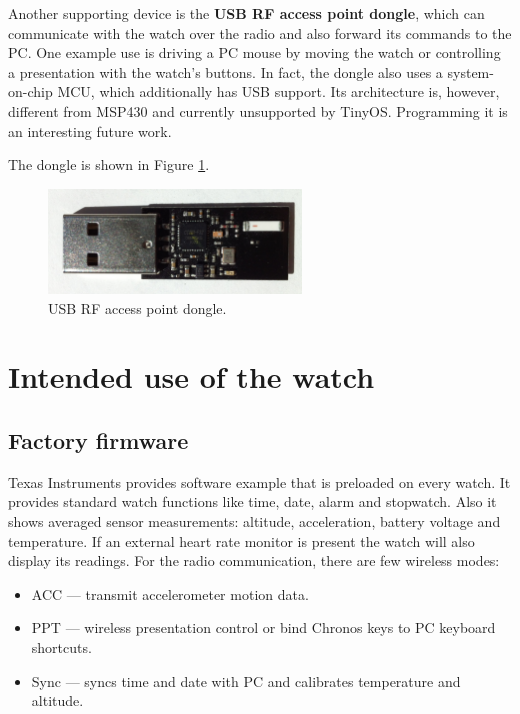 Another supporting device is the {\bf USB RF access point dongle},
which can communicate with the watch over the radio and also forward
its commands to the PC. One example use is driving a PC mouse by
moving the watch or controlling a presentation with the watch's
buttons. In fact, the dongle also uses a system-on-chip MCU, which
additionally has USB support. Its architecture is, however, different
from MSP430 and currently unsupported by TinyOS. Programming it is an
interesting future work.

The dongle is shown in Figure \ref{fig:chronos_rfdongle}.

\begin{figure}[h]
  \centering
  \includegraphics[width=0.6\textwidth]{img/chronos_rfdongle.jpg}
  \caption{USB RF access point dongle.}
  \label{fig:chronos_rfdongle}
\end{figure}

\section{Intended use of the watch}

\subsection{Factory firmware}

Texas Instruments provides software example that is preloaded on every
watch. It provides standard watch functions like time, date, alarm and
stopwatch. Also it shows averaged sensor measurements: altitude,
acceleration, battery voltage and temperature. If an external  heart
rate monitor is present the watch will also display its readings. For
the radio communication, there are few wireless modes:

\begin{itemize}
  \item ACC --- transmit accelerometer motion data.
  \item PPT --- wireless presentation control or bind Chronos
    keys to PC keyboard shortcuts.
  \item Sync --- syncs time and date with PC and calibrates
    temperature and altitude. %
\end{itemize}

